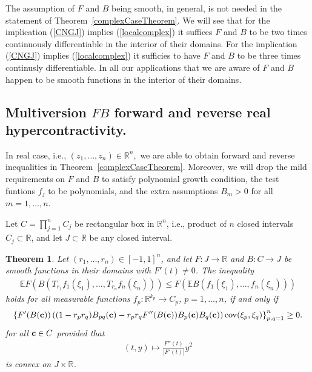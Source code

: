 \documentclass[9pt, a4paper]{amsart}
\newcommand{\R}{\mathbb{R}}
\newcommand{\1}{{\chi_{}}}%
\newtheorem{theorem}{Theorem}
\numberwithin{equation}{section}
\begin{document}
The assumption of $F$ and $B$ being smooth,  in general, is not needed in the statement of Theorem~\ref{complexCaseTheorem}.  We will see that for the implication  (\ref{CNGJ}) implies (\ref{localcomplex}) it suffices $F$ and $B$ to be two times continuously differentiable in the interior of their domains. For the implication (\ref{CNGJ}) implies (\ref{localcomplex})  it sufficies to have $F$ and $B$ to be three times continusly differentiable. In all our applications that we are aware of $F$ and $B$ happen to be smooth functions in the interior of their domains. 

\subsection{Multiversion $FB$ forward and reverse real hypercontractivity.} In real case, i.e.,  $(z_{1}, \ldots, z_{n}) \in \mathbb{R}^{n},$ we are able to obtain forward and reverse inequalities in Theorem~\ref{complexCaseTheorem}. Moreover, we will drop the mild requirements on $F$ and  $B$ to satisfy polynomial growth condition, the test funtions $f_{j}$ to be polynomials, and the extra assumptions $B_{m}>0$ for all $m=1, \ldots, n$. 

Let $C=\prod_{j=1}^{n}C_{j}$ be rectangular box in $\mathbb{R}^{n}$, i.e., product of $n$ closed intervals $C_{j}\subset \mathbb{R}$, and let $J\subset \mathbb{R}$ be any closed interval. 

\begin{theorem}\label{FBrealTheorem}
 Let $(r_1,\ldots,r_n)\in[-1,1]^n$, and let $F : J \to \mathbb{R}$ and $ B : C \to J $ be smooth functions in their domains with $F'(t)\neq0$. The inequality 
\vspace{0.2cm}
\begin{align}\label{NGJ}
\mathbb{E}F ( B(T_{r_1}f_1(\xi_1), \ldots, T_{r_n}f_n( \xi_n)))\leq F\left(	\mathbb{E}B(f_1(\xi_1), \ldots, f_n(\xi_n))\right)
\end{align} 
\vspace{0.2cm}
holds for all measurable functions $f_p:\R^{k_p}\to C_{p}$, $p=1,\ldots,n$,  if and only if 
\vspace{0.2cm}
\begin{align}\label{Nlocal}
\left\{F'(B({\bf{c}}))\left((1-r_pr_q)B_{pq}({\bf{c}})-r_pr_q F''(B({\bf{c}}))B_{p}({\bf{c}})B_{q}({\bf{c}}) \right)\mathrm{cov}(\xi_{p}, \xi_{q}) \right\}_{p,q=1}^n\geq 0.
\end{align}
\vspace{0.2cm}
for all ${\bf{c}}\in C$ provided that 
\begin{align}\label{functional}
(t,y) \mapsto \frac{F''(t)}{|F'(t)|}y^{2}
\end{align}
is convex on $J\times \R$. 
\end{theorem}
\end{document}
